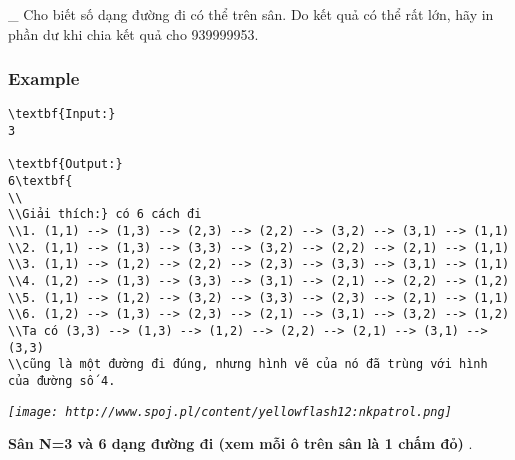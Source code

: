    \_ Cho biết số dạng đường đi có thể trên sân. Do kết quả có thể rất lớn, hãy in phần dư khi chia kết quả cho 939999953.  

\subsubsection{   Example  }
\begin{verbatim}
\textbf{Input:}
3

\textbf{Output:}
6\textbf{
\\
\\Giải thích:} có 6 cách đi
\\1. (1,1) --> (1,3) --> (2,3) --> (2,2) --> (3,2) --> (3,1) --> (1,1)
\\2. (1,1) --> (1,3) --> (3,3) --> (3,2) --> (2,2) --> (2,1) --> (1,1)
\\3. (1,1) --> (1,2) --> (2,2) --> (2,3) --> (3,3) --> (3,1) --> (1,1)
\\4. (1,2) --> (1,3) --> (3,3) --> (3,1) --> (2,1) --> (2,2) --> (1,2)
\\5. (1,1) --> (1,2) --> (3,2) --> (3,3) --> (2,3) --> (2,1) --> (1,1)
\\6. (1,2) --> (1,3) --> (2,3) --> (2,1) --> (3,1) --> (3,2) --> (1,2)
\\Ta có (3,3) --> (1,3) --> (1,2) --> (2,2) --> (2,1) --> (3,1) --> (3,3) 
\\cũng là một đường đi đúng, nhưng hình vẽ của nó đã trùng với hình của đường số 4.\end{verbatim}

\emph{
\texttt{[image: http://www.spoj.pl/content/yellowflash12:nkpatrol.png]}}

\textbf{    Sân N=3 và 6 dạng đường đi (xem mỗi ô trên sân là 1 chấm đỏ)   }   .  
